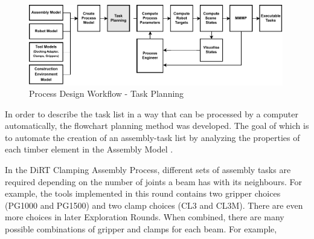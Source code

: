 \begin{figure}[!h]
    \centering
    \includegraphics[width=0.99\textwidth]{images/6a/process_2.pdf}
    \caption{Process Design Workflow - Task Planning}
    \label{fig:process-design-2}
\end{figure}

In order to describe the task list in a way that can be processed by a computer automatically, the flowchart planning method was developed. The goal of which is to automate the creation of an assembly-task list by analyzing the properties of each timber element in the Assembly Model \parencite{huangNewAnalogProtocol2021}.

In the DiRT Clamping Assembly Process, different sets of assembly tasks are required depending on the number of joints a beam has with its neighbours. For example, the tools implemented in this round contains two gripper choices (PG1000 and PG1500) and two clamp choices (CL3 and CL3M). There are even more choices in later Exploration Rounds. When combined, there are many possible combinations of gripper and clamps for each beam. For example,


